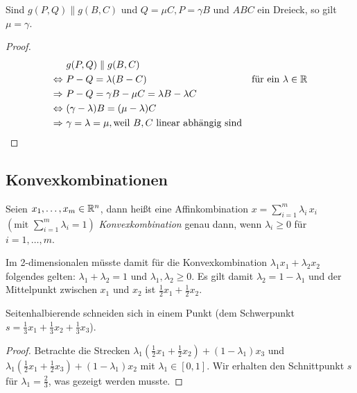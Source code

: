 \begin{thm}
	Sind $g(P,Q) \parallel g(B,C)$ und $Q = \mu C, P = \gamma B$ und $ABC$ ein Dreieck, so gilt $\mu
	= \gamma$.
	\begin{proof}
		\begin{align*}
			 & g(P,Q) \parallel g(B,C)\\
			\Leftrightarrow \ & P-Q = \lambda(B-C) & \text{für ein } \lambda \in \mathbb R\\
			\Rightarrow \ & P-Q = \gamma B - \mu C = \lambda B - \lambda C\\
			\Leftrightarrow \ & (\gamma - \lambda) B = (\mu - \lambda) C\\
			\Rightarrow \ & \gamma = \lambda = \mu, \text{weil $B,C$ linear abhängig sind}
		\end{align*}
	\end{proof}
\end{thm}


\subsection*{Konvexkombinationen} %
\label{sub:Konvexkombinationen}

\begin{defi}
	Seien $x_1, \dots, x_m \in \mathbb R^n$, dann heißt eine Affinkombination $x = \sum\limits_{i=1}^m
	\lambda_i \, x_i$ $\left( \text{mit } \sum\limits_{i=1}^m \lambda_i = 1 \right)$ {\em
	Konvexkombination} genau dann, wenn $\lambda_i \geq 0$ für $i = 1, \dots, m$.
\end{defi}

Im 2-dimensionalen müsste damit für die Konvexkombination $\lambda_1 x_1 + \lambda_2 x_2$ folgendes
gelten: $\lambda_1 +\lambda_2 = 1$ und $\lambda_1, \lambda_2 \geq 0$. Es gilt damit $\lambda_2 =
1-\lambda_1$ und der Mittelpunkt zwischen $x_1$ und $x_2$ ist $\frac{1}{2} x_1 + \frac{1}{2} x_2$.

\begin{thm}
	Seitenhalbierende schneiden sich in einem Punkt (dem Schwerpunkt $s = \frac{1}{3} x_1 +
	\frac{1}{3} x_2 + \frac{1}{3} x_3$).
	\begin{proof}
		Betrachte die Strecken $\lambda_1 (\frac{1}{2} x_1 + \frac{1}{2} x_2) + (1 - \lambda_1) x_3$
		und $\lambda_1 (\frac{1}{2} x_1 + \frac{1}{2} x_3) + (1 - \lambda_1) x_2$ mit $\lambda_1 \in
		[0,1]$. Wir erhalten den Schnittpunkt $s$ für $\lambda_1 = \frac{2}{3}$, was gezeigt werden
		musste.
	\end{proof}
\end{thm}

